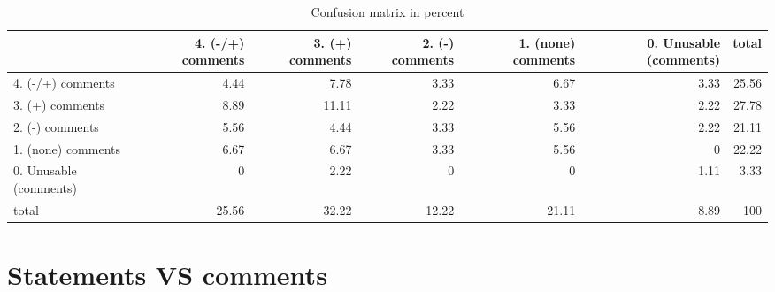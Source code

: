 \documentclass{article}
\begin{document}
\begin{table}[H]

\centering

\begin{tabular}{lrrrrrr}
\hline
                        &   4. (-/+) comments &   3. (+) comments &   2. (-) comments &   1. (none) comments &   0. Unusable (comments) &   total \\
\hline
 4. (-/+) comments      &                4.44 &              7.78 &              3.33 &                 6.67 &                     3.33 &   25.56 \\
 3. (+) comments        &                8.89 &             11.11 &              2.22 &                 3.33 &                     2.22 &   27.78 \\
 2. (-) comments        &                5.56 &              4.44 &              3.33 &                 5.56 &                     2.22 &   21.11 \\
 1. (none) comments     &                6.67 &              6.67 &              3.33 &                 5.56 &                     0    &   22.22 \\
 0. Unusable (comments) &                0    &              2.22 &              0    &                 0    &                     1.11 &    3.33 \\
 total                  &               25.56 &             32.22 &             12.22 &                21.11 &                     8.89 &  100    \\
\hline
\end{tabular}\caption{Confusion matrix in percent}

\end{table}



\section{Statements VS comments} 
\end{document}
